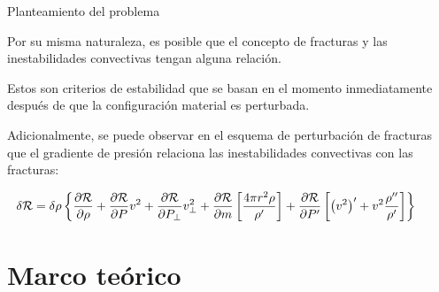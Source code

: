 \documentclass[handout,t]{beamer}
\begin{document}
\begin{frame}{Planteamiento del problema}

\justifying

Por su misma naturaleza, es posible que el concepto de fracturas y las inestabilidades convectivas tengan alguna relación.

\vspace{3mm}

Estos son criterios de estabilidad que se basan en el momento inmediatamente después de que la configuración material es perturbada.

\vspace{3mm}

Adicionalmente, se puede observar en el esquema de perturbación de fracturas que el gradiente de presión relaciona las inestabilidades convectivas con las fracturas:

\vspace{-6mm}

\begin{equation*}
\hspace{-8mm}
\scriptsize
\label{EqHidPer}
\delta \mathcal{R} = \delta \rho \left\lbrace \frac{\partial \mathcal{R}}{\partial \rho} + \frac{\partial \mathcal{R}}{\partial P} v^{2} + \frac{\partial \mathcal{R}}{\partial P_{\perp}} v^{2}_{\perp} + \frac{\partial \mathcal{R}}{\partial m} \left[ \frac{4 \pi r^{2} \rho}{\rho^{\prime}} \right] + \frac{\partial \mathcal{R}}{\partial P^{\prime}} \left[ { \left( v^{2} \right) }^{\prime} + v^{2} \frac{\rho^{\prime \prime}}{\rho^{\prime}} \right] \right\rbrace
\end{equation*}
    
\end{frame}

\section{Marco teórico}





\end{document}
